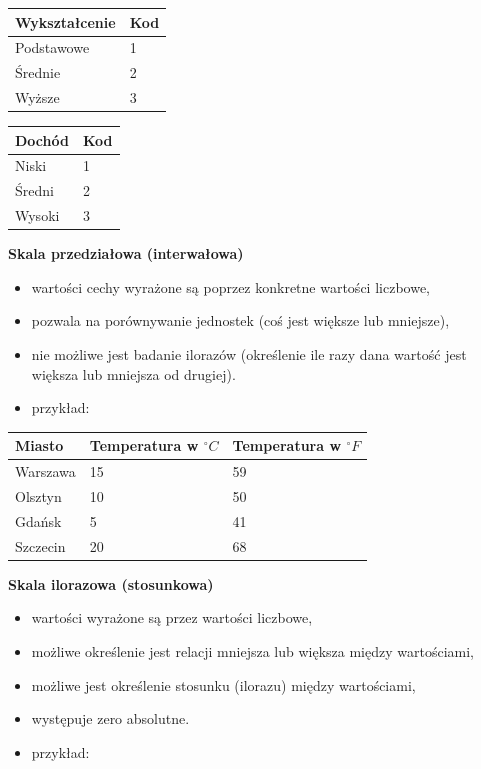 \documentclass[
  polish,
  letterpaper,
  DIV=11,
  numbers=noendperiod]{scrreprt}
\providecommand{\tightlist}{%
  \setlength{\itemsep}{0pt}\setlength{\parskip}{0pt}}
\begin{document}
\begin{longtable}[]{@{}ll@{}}
\toprule\noalign{}
Wykształcenie & Kod \\
\midrule\noalign{}
\endhead
\bottomrule\noalign{}
\endlastfoot
Podstawowe & 1 \\
Średnie & 2 \\
Wyższe & 3 \\
\end{longtable}

\begin{longtable}[]{@{}ll@{}}
\toprule\noalign{}
Dochód & Kod \\
\midrule\noalign{}
\endhead
\bottomrule\noalign{}
\endlastfoot
Niski & 1 \\
Średni & 2 \\
Wysoki & 3 \\
\end{longtable}

\textbf{Skala przedziałowa (interwałowa)}

\begin{itemize}
\tightlist
\item
  wartości cechy wyrażone są poprzez konkretne wartości liczbowe,
\item
  pozwala na porównywanie jednostek (coś jest większe lub mniejsze),
\item
  nie możliwe jest badanie ilorazów (określenie ile razy dana wartość
  jest większa lub mniejsza od drugiej).
\item
  przykład:
\end{itemize}

\begin{longtable}[]{@{}lll@{}}
\toprule\noalign{}
Miasto & Temperatura w \(^{\circ}C\) & Temperatura w \(^{\circ}F\) \\
\midrule\noalign{}
\endhead
\bottomrule\noalign{}
\endlastfoot
Warszawa & 15 & 59 \\
Olsztyn & 10 & 50 \\
Gdańsk & 5 & 41 \\
Szczecin & 20 & 68 \\
\end{longtable}

\textbf{Skala ilorazowa (stosunkowa)}

\begin{itemize}
\tightlist
\item
  wartości wyrażone są przez wartości liczbowe,
\item
  możliwe określenie jest relacji mniejsza lub większa między
  wartościami,
\item
  możliwe jest określenie stosunku (ilorazu) między wartościami,
\item
  występuje zero absolutne.
\item
  przykład:
\end{itemize}
\end{document}
